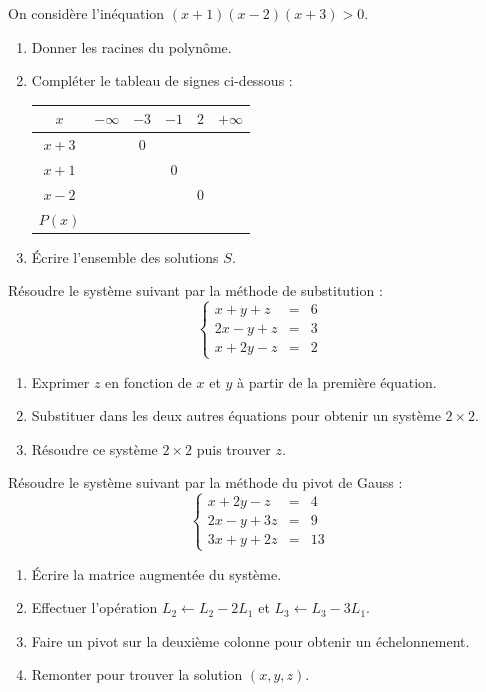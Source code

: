 \documentclass[11pt]{article}
\begin{document}
\begin{exercice}
On considère l'inéquation $(x+1)(x-2)(x+3) > 0$.
\begin{enumerate}
    \item Donner les racines du polynôme.
    \item Compléter le tableau de signes ci-dessous :
    \begin{center}
    \begin{tabular}{|c|cccc|c|}
    \hline
    $x$ & $-\infty$ & $-3$ & $-1$ & $2$ & $+\infty$ \\
    \hline
    $x+3$ & & $0$ & & & \\
    $x+1$ & & & $0$ & & \\
    $x-2$ & & & & $0$ & \\
    \hline
    $P(x)$ & & & & & \\
    \hline
    \end{tabular}
    \end{center}
    \item Écrire l'ensemble des solutions $S$.
\end{enumerate}
\end{exercice}

\begin{exercice}
Résoudre le système suivant par la méthode de substitution :
\[
\left\{
\begin{array}{rcl}
x + y + z &=& 6 \\
2x - y + z &=& 3 \\
x + 2y - z &=& 2
\end{array}
\right.
\]
\begin{enumerate}
    \item Exprimer $z$ en fonction de $x$ et $y$ à partir de la première équation.
    \item Substituer dans les deux autres équations pour obtenir un système $2 \times 2$.
    \item Résoudre ce système $2 \times 2$ puis trouver $z$.
\end{enumerate}
\end{exercice}

\begin{exercice}
Résoudre le système suivant par la méthode du pivot de Gauss :
\[
\left\{
\begin{array}{rcl}
x + 2y - z &=& 4 \\
2x - y + 3z &=& 9 \\
3x + y + 2z &=& 13
\end{array}
\right.
\]
\begin{enumerate}
    \item Écrire la matrice augmentée du système.
    \item Effectuer l'opération $L_2 \leftarrow L_2 - 2L_1$ et $L_3 \leftarrow L_3 - 3L_1$.
    \item Faire un pivot sur la deuxième colonne pour obtenir un échelonnement.
    \item Remonter pour trouver la solution $(x, y, z)$.
\end{enumerate}
\end{exercice}
\end{document}
